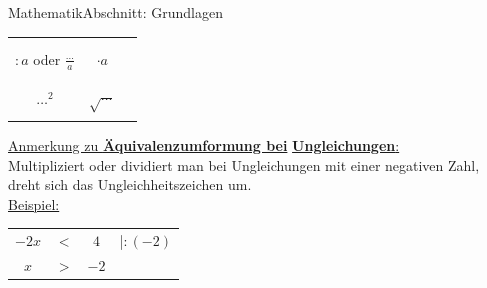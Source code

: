\documentclass[11pt,twocolumn,oneside,openany,headings=optiontotoc,11pt,numbers=noenddot]{article}
\begin{document}
\begin{worksheet}{}{Mathematik}{Abschnitt: Grundlagen}
\begin{tabularx}{0.45\textwidth}{|c|c|X|}
			\multicolumn{1}{|l|}{} & & \\
			\cline{1-2}
			\multicolumn{1}{|l|}{} & & \\
			\(:a\) oder \(\frac{\ldots}{a}\) & \(\cdot{}a\) & \\
			\multicolumn{1}{|l|}{} & & \\
			\cline{1-2}
			\multicolumn{1}{|l|}{} & & \\
			\(\ldots^2\) & \glqq{}\(\sqrt{\ldots}\)\grqq{} & \\
			\multicolumn{1}{|l|}{} & & \\
			\hline
		\end{tabularx}
		\par\bigskip\noindent
		\underline{Anmerkung zu \textbf{Äquivalenzumformung bei}} \underline{\textbf{Ungleichungen}:}\\
		Multipliziert oder dividiert man bei Ungleichungen mit einer negativen Zahl, dreht sich das Ungleichheitszeichen um.\\
		\underline{Beispiel:}
		\begin{tabularx}{0.5\textwidth}{cccl}
			\(-2x\) & \(<\) & \(4\) & |\(:(-2)\)\\
			\(x\) & \(>\) & \(-2\)
		\end{tabularx}
	\end{worksheet}
\end{document}

